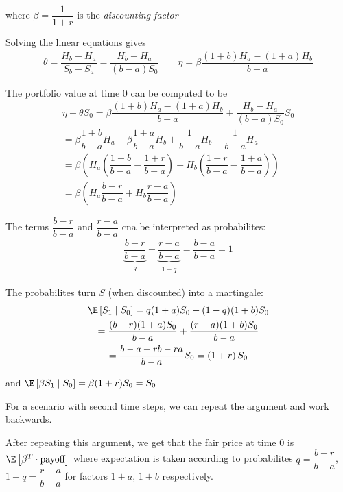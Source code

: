 \noindent where $\beta = \dfrac{1}{1+r}$ is the \textit{discounting factor}
\par\bigskip
\noindent Solving the linear equations gives
\begin{equation*}
  \begin{gathered}
    \theta = \dfrac{H_b-H_a}{S_b-S_a} = \dfrac{H_b-H_a}{(b-a)S_0}\qquad\eta = \beta\dfrac{(1+b)H_a-(1+a)H_b}{b-a}
  \end{gathered}
\end{equation*}\par
\noindent The portfolio value at time 0 can be computed to be
\begin{equation*}
  \begin{gathered}
    \eta+\theta S_0 = \beta\dfrac{(1+b)H_a-(1+a)H_b}{b-a} + \dfrac{H_b-H_a}{(b-a)S_0}S_0\\
    =\beta\dfrac{1+b}{b-a}H_a-\beta\dfrac{1+a}{b-a}H_b + \dfrac{1}{b-a}H_b-\dfrac{1}{b-a}H_a\\
    =\beta\left(H_a\left(\dfrac{1+b}{b-a}-\dfrac{1+r}{b-a}\right)+H_b\left(\dfrac{1+r}{b-a}-\dfrac{1+a}{b-a}\right)\right)\\
    =\beta\left(H_a\dfrac{b-r}{b-a}+H_b\dfrac{r-a}{b-a}\right)
  \end{gathered}
\end{equation*}\par
\noindent The terms $\dfrac{b-r}{b-a}$ and $\dfrac{r-a}{b-a}$ cna be interpreted as probabilites:
\begin{equation*}
  \begin{gathered}
    \underbrace{\dfrac{b-r}{b-a}}_{\substack{q}}+\underbrace{\dfrac{r-a}{b-a}}_{\substack{1-q}} = \dfrac{b-a}{b-a} = 1
  \end{gathered}
\end{equation*}\par
\noindent The probabilites turn $S$ (when discounted) into a martingale:
\begin{equation*}
  \begin{gathered}
    \E\left[S_1\mid S_0\right] = q(1+a)S_0+(1-q)(1+b)S_0\\
    = \dfrac{(b-r)(1+a)S_0}{b-a} + \dfrac{(r-a)(1+b)S_0}{b-a}\\
    = \dfrac{b-a+rb-ra}{b-a}S_0 = \left(1+r\right)S_0
  \end{gathered}
\end{equation*}\par
\noindent and $\E\left[\beta S_1\mid S_0\right] = \beta(1+r)S_0 = S_0$
\par\bigskip
\noindent For a scenario with second time steps, we can repeat the argument and work backwards.\par
\noindent After repeating this argument, we get that the fair price at time 0 is $\E\left[\beta^T\cdot\text{payoff}\right]$ where expectation is taken according to probabilites $q = \dfrac{b-r}{b-a}$, $1-q = \dfrac{r-a}{b-a}$ for factors $1+a$, $1+b$ respectively.\par

